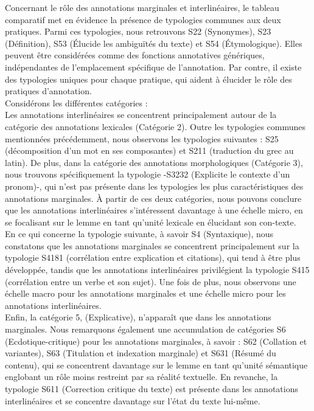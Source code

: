 \documentclass[a4paper, twoside, 12pt]{book}
\begin{document}
{Concernant le rôle des annotations marginales et interlinéaires, le tableau comparatif met en évidence la présence de typologies communes aux deux pratiques. Parmi ces typologies, nous retrouvons S22 (Synonymes), S23 (Définition), S53 (Élucide les ambiguïtés du texte) et S54 (Étymologique). Elles peuvent être considérées comme des fonctions annotatives génériques, indépendantes de l'emplacement spécifique de l'annotation. Par contre, il existe des typologies uniques pour chaque pratique, qui aident à élucider le rôle des pratiques d'annotation. \\

Considérons les différentes catégories :\\

Les annotations interlinéaires se concentrent principalement autour de la catégorie des annotations lexicales (Catégorie 2). Outre les typologies communes mentionnées précédemment, nous observons les typologies suivantes : S25 (décomposition d'un mot en ses composantes) et S211 (traduction du grec au latin). De plus, dans la catégorie des annotations morphologiques (Catégorie 3), nous trouvons spécifiquement la typologie -S3232 (Explicite le contexte d'un pronom)-, qui n'est pas présente dans les typologies les plus caractéristiques des annotations marginales. À partir de ces deux catégories, nous pouvons conclure que les annotations interlinéaires s'intéressent davantage à une échelle micro, en se focalisant sur le lemme en tant qu'unité lexicale en élucidant son con-texte.\\

En ce qui concerne la typologie suivante, à savoir S4 (Syntaxique), nous constatons que les annotations marginales se concentrent principalement sur la typologie S4181 (corrélation entre explication et citations), qui tend à être plus développée, tandis que les annotations interlinéaires privilégient la typologie S415 (corrélation entre un verbe et son sujet). Une fois de plus, nous observons une échelle macro pour les annotations marginales et une échelle micro pour les annotations interlinéaires.\\

Enfin, la catégorie 5, (Explicative), n'apparaît que dans les annotations marginales. Nous remarquons également une accumulation de catégories S6 (Ecdotique-critique) pour les annotations marginales, à savoir : S62 (Collation et variantes), S63 (Titulation et indexation marginale) et S631 (Résumé du contenu), qui se concentrent davantage sur le lemme en tant qu'unité sémantique englobant un rôle moins restreint par sa réalité textuelle. En revanche, la typologie S611 (Correction critique du texte) est présente dans les annotations interlinéaires et se concentre davantage sur l'état du texte lui-même.\\

}
\end{document}
